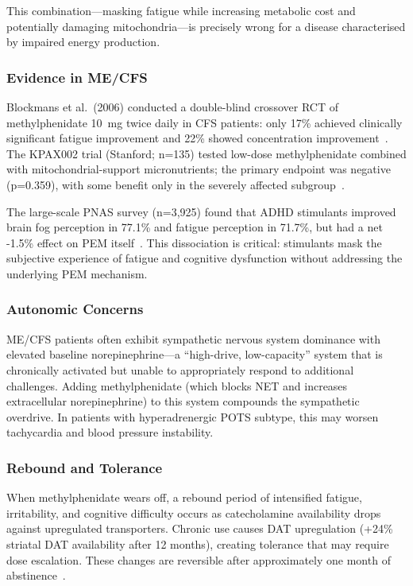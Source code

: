 This combination---masking fatigue while increasing metabolic cost and potentially damaging mitochondria---is precisely wrong for a disease characterised by impaired energy production.

\subsubsection{Evidence in ME/CFS}

Blockmans et al.\ (2006) conducted a double-blind crossover RCT of methylphenidate 10~mg twice daily in CFS patients: only 17\% achieved clinically significant fatigue improvement and 22\% showed concentration improvement~\cite{Blockmans2006methylphenidate}. The KPAX002 trial (Stanford; n=135) tested low-dose methylphenidate combined with mitochondrial-support micronutrients; the primary endpoint was negative (p=0.359), with some benefit only in the severely affected subgroup~\cite{Kaiser2015KPAX002}.

The large-scale PNAS survey (n=3,925) found that ADHD stimulants improved brain fog perception in 77.1\% and fatigue perception in 71.7\%, but had a net -1.5\% effect on PEM itself~\cite{Vernon2025PNAS}. This dissociation is critical: stimulants mask the subjective experience of fatigue and cognitive dysfunction without addressing the underlying PEM mechanism.

\subsubsection{Autonomic Concerns}

ME/CFS patients often exhibit sympathetic nervous system dominance with elevated baseline norepinephrine---a ``high-drive, low-capacity'' system that is chronically activated but unable to appropriately respond to additional challenges. Adding methylphenidate (which blocks NET and increases extracellular norepinephrine) to this system compounds the sympathetic overdrive. In patients with hyperadrenergic POTS subtype, this may worsen tachycardia and blood pressure instability.

\subsubsection{Rebound and Tolerance}

When methylphenidate wears off, a rebound period of intensified fatigue, irritability, and cognitive difficulty occurs as catecholamine availability drops against upregulated transporters. Chronic use causes DAT upregulation (+24\% striatal DAT availability after 12 months), creating tolerance that may require dose escalation. These changes are reversible after approximately one month of abstinence~\cite{Wang2013DATupregulation}.

